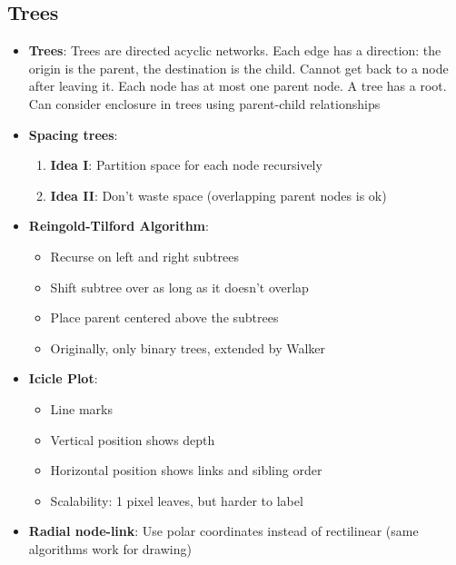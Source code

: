 \documentclass{report}
\begin{document}
    \pagebreak 
    \subsection{Trees}
    \begin{itemize}
        \item \textbf{Trees}: Trees are directed acyclic networks. Each edge has a direction: the origin is the parent, the destination is the child. Cannot get back to a node after leaving it. Each node has at most one parent node. A tree has a root.
            \bigbreak \noindent 
            Can consider enclosure in trees using parent-child relationships
            \bigbreak \noindent 
        \item \textbf{Spacing trees}: 
            \begin{enumerate}
                \item \textbf{Idea I}: Partition space for each node recursively
                \item \textbf{Idea II}: Don't waste space (overlapping parent nodes is ok)
            \end{enumerate}
        \item \textbf{Reingold-Tilford Algorithm}:
            \begin{itemize}
                \item Recurse on left and right subtrees
                \item Shift subtree over as long as it doesn’t overlap
                \item Place parent centered above the subtrees
                \item Originally, only binary trees, extended by Walker
            \end{itemize}
            \bigbreak \noindent 
        \item \textbf{Icicle Plot}: 
            \begin{itemize}
                \item Line marks
                \item Vertical position shows depth
                \item Horizontal position shows links and sibling order
                \item Scalability: 1 pixel leaves, but harder to label
            \end{itemize}
            \bigbreak \noindent 
        \item \textbf{Radial node-link}: Use polar coordinates instead of rectilinear (same algorithms work for drawing)

\end{itemize}
\end{document}
